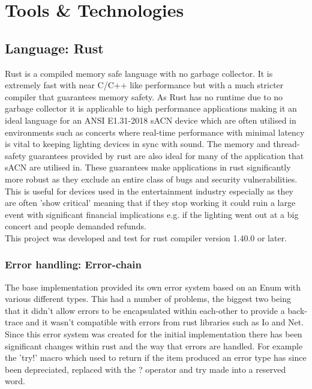 \documentclass[11pt,a4paper]{article}
\begin{document}
\section{Tools \& Technologies}
\subsection{Language: Rust}
Rust \cite{RUST_LANG} is a compiled memory safe language with no garbage collector. It is extremely fast with near C/C++ like performance \cite{RUST_C_COMPARISON} but with a much stricter compiler that guarantees memory safety. As Rust has no runtime due to no garbage collector it is applicable to high performance applications making it an ideal language for an ANSI E1.31-2018 sACN device which are often utilised in environments such as concerts where real-time performance with minimal latency is vital to keeping lighting devices in sync with sound. The memory and thread-safety guarantees provided by rust are also ideal for many of the application that sACN are utilised in. These guarantees make applications in rust significantly more robust as they exclude an entire class of bugs and security vulnerabilities. This is useful for devices used in the entertainment industry especially as they are often 'show critical' meaning that if they stop working it could ruin a large event with significant financial implications e.g. if the lighting went out at a big concert and people demanded refunds.\\

This project was developed and test for rust compiler version 1.40.0 or later.

\subsubsection{Error handling: Error-chain}
The base implementation provided its own error system based on an Enum with various different types. This had a number of problems, the biggest two being that it didn't allow errors to be encapsulated within each-other to provide a back-trace and it wasn't compatible with errors from rust libraries such as Io and Net. Since this error system was created for the initial implementation there has been significant changes within rust and the way that errors are handled. For example the 'try!' \cite{RUST_TRY} macro which used to return if the item produced an error type has since been depreciated, replaced with the ? operator and try made into a reserved word.\\
\end{document}
